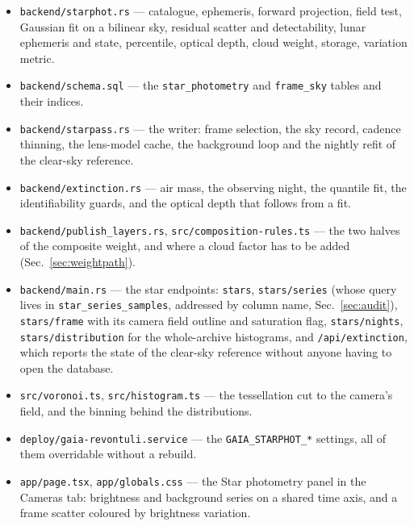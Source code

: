\documentclass[11pt,a4paper]{article}
\begin{document}
\begin{itemize}
  \item \texttt{backend/starphot.rs} --- catalogue, ephemeris, forward
    projection, field test, Gaussian fit on a bilinear sky, residual scatter and
    detectability, lunar ephemeris and state, percentile, optical depth, cloud
    weight, storage, variation metric.
  \item \texttt{backend/schema.sql} --- the \texttt{star\_photometry} and
    \texttt{frame\_sky} tables and their indices.
  \item \texttt{backend/starpass.rs} --- the writer: frame selection, the sky
    record, cadence thinning, the lens-model cache, the background loop and the
    nightly refit of the clear-sky reference.
  \item \texttt{backend/extinction.rs} --- air mass, the observing night, the
    quantile fit, the identifiability guards, and the optical depth that
    follows from a fit.
  \item \texttt{backend/publish\_layers.rs}, \texttt{src/composition-rules.ts}
    --- the two halves of the composite weight, and where a cloud factor has to
    be added (Sec.~\ref{sec:weightpath}).
  \item \texttt{backend/main.rs} --- the star endpoints: \texttt{stars},
    \texttt{stars/series} (whose query lives in \texttt{star\_series\_samples},
    addressed by column name, Sec.~\ref{sec:audit}),
    \texttt{stars/frame} with its camera field outline
    and saturation flag, \texttt{stars/nights}, \texttt{stars/distribution} for
    the whole-archive histograms, and \texttt{/api/extinction}, which reports
    the state of the clear-sky reference without anyone having to open the
    database.
  \item \texttt{src/voronoi.ts}, \texttt{src/histogram.ts} --- the tessellation
    cut to the camera's field, and the binning behind the distributions.
  \item \texttt{deploy/gaia-revontuli.service} --- the \texttt{GAIA\_STARPHOT\_*}
    settings, all of them overridable without a rebuild.
  \item \texttt{app/page.tsx}, \texttt{app/globals.css} --- the Star photometry
    panel in the Cameras tab: brightness and background series on a shared time
    axis, and a frame scatter coloured by brightness variation.
\end{itemize}
\end{document}
